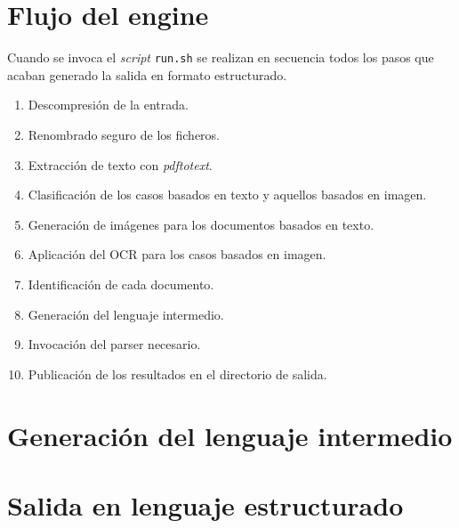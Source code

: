 
\section{Flujo del engine}

Cuando se invoca el \emph{script} \verb|run.sh| se realizan en secuencia todos los pasos que acaban generado la salida en formato estructurado.

\begin{enumerate}
    \item Descompresión de la entrada.
    \item Renombrado seguro de los ficheros.
    \item Extracción de texto con \emph{pdftotext}.
    \item Clasificación de los casos basados en texto y aquellos basados en imagen.
    \item Generación de imágenes para los documentos basados en texto.
    \item Aplicación del OCR para los casos basados en imagen.
    \item Identificación de cada documento.
    \item Generación del lenguaje intermedio.
    \item Invocación del parser necesario.
    \item Publicación de los resultados en el directorio de salida.
\end{enumerate}

\section{Generación del lenguaje intermedio}
\section{Salida en lenguaje estructurado}